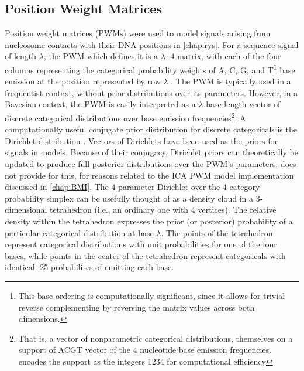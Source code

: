\subsection{Position Weight Matrices}
\label{ssec:PWM}
Position weight matrices (PWMs) were used to model signals arising from nucleosome contacts with their DNA positions in \autoref{chap:rys}. For a sequence signal of length $\lambda$, the PWM which defines it is a $\lambda \cdot 4$ matrix, with each of the four columns representing the categorical probability weights of A, C, G, and T\footnote{This base ordering is computationally significant, since it allows for trivial reverse complementing by reversing the matrix values across both dimensions.} base emission at the position represented by row $\lambda$ \cite{Stormo1982}. The PWM is typically used in a frequentist context, without prior distributions over its parameters. However, in a Bayesian context, the PWM is easily interpreted as a $\lambda$-base length vector of discrete categorical distributions over base emission frequencies\footnote{That is, a vector of nonparametric categorical distributions, themselves on a support of ACGT vector of the 4 nucleotide base emission frequencies.  encodes the support as the integers 1234 for computational efficiency}. A computationally useful conjugate prior distribution for discrete categoricals is the Dirichlet distribution \cite{Minka2000}. Vectors of Dirichlets have been used as the priors for signals in  models. Because of their conjugacy, Dirichlet priors can theoretically be updated to produce full posterior distributions over the PWM's parameters.  does not provide for this, for reasons related to the ICA PWM model implementation discussed in \autoref{chap:BMI}. The 4-parameter Dirichlet over the 4-category probability simplex can be usefully thought of as a density cloud in a 3-dimensional tetrahedron (i.e., an ordinary one with 4 vertices). The relative density within the tetrahedron expresses the prior (or posterior) probability of a particular categorical distribution at base $\lambda$. The points of the tetrahedron represent categorical distributions with unit probabilities for one of the four bases, while points in the center of the tetrahedron represent categoricals with identical .25 probabilites of emitting each base. 

